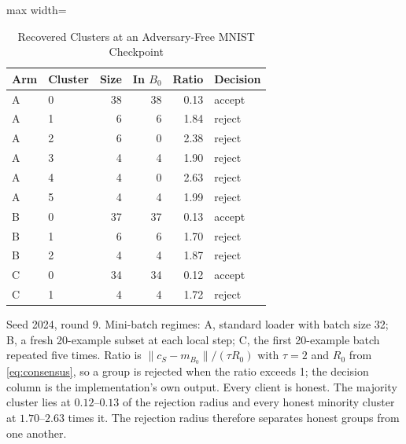 \begin{table}[!t]
\centering\footnotesize
\setlength{\tabcolsep}{4pt}
\caption{Recovered Clusters at an Adversary-Free MNIST Checkpoint}\label{tab:cluster_ratios}
\begin{adjustbox}{max width=\columnwidth}
\begin{tabular}{llrrrl}
\toprule
Arm & Cluster & Size & In $B_0$ & Ratio & Decision \\
\midrule
A & 0 & 38 & 38 & 0.13 & accept \\
A & 1 & 6 & 6 & 1.84 & reject \\
A & 2 & 6 & 0 & 2.38 & reject \\
A & 3 & 4 & 4 & 1.90 & reject \\
A & 4 & 4 & 0 & 2.63 & reject \\
A & 5 & 4 & 4 & 1.99 & reject \\
B & 0 & 37 & 37 & 0.13 & accept \\
B & 1 & 6 & 6 & 1.70 & reject \\
B & 2 & 4 & 4 & 1.87 & reject \\
C & 0 & 34 & 34 & 0.12 & accept \\
C & 1 & 4 & 4 & 1.72 & reject \\
\bottomrule
\end{tabular}
\end{adjustbox}

\par\vspace{3pt}\parbox{\linewidth}{\footnotesize Seed 2024, round 9. Mini-batch regimes: A, standard loader with batch size 32; B, a fresh 20-example subset at each local step; C, the first 20-example batch repeated five times. Ratio is $\lVert c_S-m_{B_0}\rVert/(\tau R_0)$ with $\tau=2$ and $R_0$ from \eqref{eq:consensus}, so a group is rejected when the ratio exceeds 1; the decision column is the implementation's own output. Every client is honest. The majority cluster lies at $0.12$--$0.13$ of the rejection radius and every honest minority cluster at $1.70$--$2.63$ times it. The rejection radius therefore separates honest groups from one another.}
\end{table}
